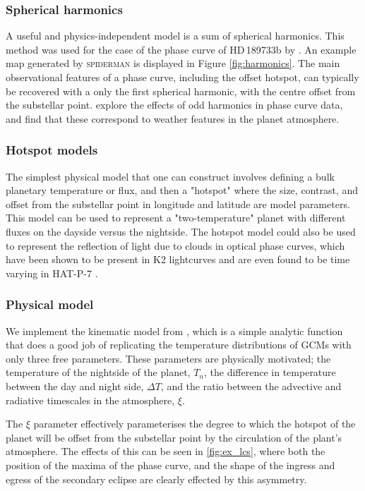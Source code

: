 \documentclass[a4paper,fleqn,usenatbib]{mnras}
\begin{document}
\subsubsection{Spherical harmonics}

A useful and physics-independent model is a sum of spherical harmonics. This method was used for the case of the phase curve of HD\,189733b by \citet{Majeau2012}. An example map generated by \textsc{spiderman} is displayed in Figure \ref{fig:harmonics}. The main observational features of a phase curve, including the offset hotspot, can typically be recovered with a only the first spherical harmonic, with the centre offset from the substellar point. \citep{Cowan2016} explore the effects of odd harmonics in phase curve data, and find that these correspond to weather features in the planet atmosphere.

\subsubsection{Hotspot models}

The simplest physical model that one can construct involves defining a bulk planetary temperature or flux, and then a "hotspot" where the size, contrast, and offset from the substellar point in longitude and latitude are model parameters. This model can be used to represent a "two-temperature" planet with different fluxes on the dayside versus the nightside. The hotspot model could also be used to represent the reflection of light due to clouds in optical phase curves, which have been shown to be present in K2 lightcurves \citep{Demory2013} and are even found to be time varying in HAT-P-7 \citep{Armstrong2016}.

\subsubsection{Physical model}

We implement the kinematic model from \citet{Zhang2016}, which is a simple analytic function that does a good job of replicating the temperature distributions of GCMs with only three free parameters. These parameters are physically motivated; the temperature of the nightside of the planet, $T_n$, the difference in temperature between the day and night side, $\Delta T$, and the ratio between the advective and radiative timescales in the atmosphere, $\xi$.

The $\xi$ parameter effectively parameterises the degree to which the hotspot of the planet will be offset from the substellar point by the circulation of the plant's atmosphere. The effects of this can be seen in \ref{fig:ex_lcs}, where both the position of the maxima of the phase curve, and the shape of the ingress and egress of the secondary eclipse are clearly effected by this asymmetry.
\end{document}
